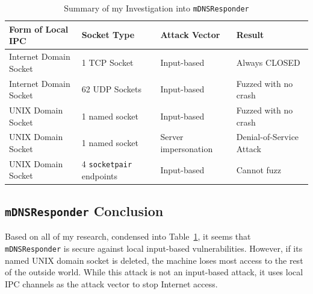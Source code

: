 \begin{table}
\centering
\begin{scriptsize}
\begin{tabular}{ l | l | l | l }
\textbf{Form of Local IPC} & \textbf{Socket Type} & \textbf{Attack Vector} & \textbf{Result} \\ \hline
Internet Domain Socket & 1 TCP Socket & Input-based & Always CLOSED \\ \hline
Internet Domain Socket & 62 UDP Sockets & Input-based & Fuzzed with no crash \\ \hline
UNIX Domain Socket & 1 named socket & Input-based & Fuzzed with no crash \\ \hline
UNIX Domain Socket & 1 named socket & Server impersonation & Denial-of-Service Attack \\ \hline
UNIX Domain Socket & 4 \texttt{socketpair} endpoints & Input-based & Cannot fuzz \\ \hline
\end{tabular}
\caption{Summary of my Investigation into \texttt{mDNSResponder}}
\label{tab:mdnsData}
\end{scriptsize}
\end{table} 

\subsection{\texttt{mDNSResponder} Conclusion}
\label{sec:mdnsConclusion}
Based on all of my research, condensed into Table~\ref{tab:mdnsData}, it seems that \texttt{mDNSResponder} is secure against local input-based vulnerabilities.  However, if its named UNIX domain socket is deleted, the machine loses most access to the rest of the outside world.  While this attack is not an input-based attack, it uses local IPC channels as the attack vector to stop Internet access.
